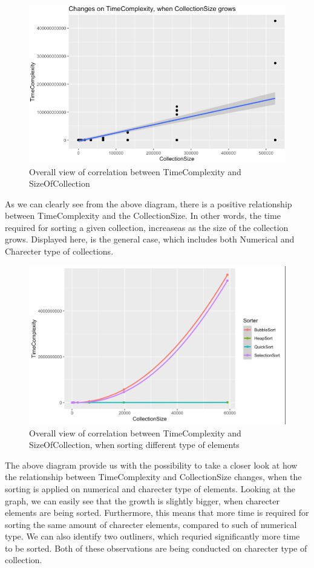 \documentclass[]{report}
\begin{document}
		\begin{figure}[h]
			\centering
			\includegraphics[width=0.7\linewidth]{timeComplexityoverall}
			\caption[Figure 3.1]{Overall view of correlation between TimeComplexity and SizeOfCollection}
		\end{figure}
	
		As we can clearly see from the above diagram, there is a positive relationship between TimeComplexity and the CollectionSize. In other words, the time required for sorting a given collection, increaseas as the size of the collection grows. Displayed here, is the general case, which includes both Numerical and Charecter type of collections. 
		
				\begin{figure}[h]
			\centering
			\includegraphics[width=0.7\linewidth]{ResultsOverallView}
			\caption[Figure 3.2]{Overall view of correlation between TimeComplexity and SizeOfCollection, when sorting different type of elements}
		\end{figure}
		
		The above diagram provide us with the possibility to take a closer look at how the relationship between TimeComplexity and CollectionSize changes, when the sorting is applied on numerical and charecter type of elements. Looking at the graph, we can easily see that the growth is slightly bigger, when charecter elements are being sorted. Furthermore, this means that more time is required for sorting the same amount of charecter elements, compared to such of numerical type. We can also identify two outliners, which requried significantly more time to be sorted. Both of these observations are being conducted on charecter type of collection.
		
\end{document}
